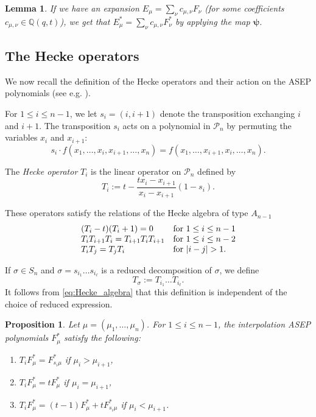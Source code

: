 \documentclass[12pt]{amsart}
\newtheorem{lem}[thm]{Lemma}
\newtheorem{prop}[thm]{Proposition}
\theoremstyle{definition}
\newcommand{\mcP}{\mathcal P}
\newcommand{\QQ}{\mathbb Q}
\begin{document}
\begin{appendices}
\begin{lem}\label{lem:dehomog}
If we have an expansion 
$E_\mu=\sum_{\nu}c_{\mu,\nu}F_\nu$
(for some coefficients $c_{\mu,\nu}\in \QQ(q,t)$), we get that 
$E^*_\mu=\sum_{\nu}c_{\mu,\nu}F^*_\nu$ by applying the map $\boldsymbol{\psi}$.
\end{lem}

\subsection{The Hecke operators}
We now recall the definition of the Hecke operators and their action on the ASEP polynomials (see e.g. \cite[Section 2.3]{BenDaliWilliams2025}).

For $1\leq i \leq n-1$, we let $s_i=(i,i+1)$ denote the transposition exchanging $i$ and $i+1$. The transposition $s_i$ acts on a polynomial in $\mcP_n$ by permuting the variables $x_i$ and $x_{i+1}$:
$$s_i\cdotp f(x_1,\dots,x_i,x_{i+1},\dots,x_n)
=f(x_1,\dots,x_{i+1},x_i,\dots,x_n).$$

The \emph{Hecke operator} $T_i$ is the linear operator on $\mcP_n$ defined by 
\begin{equation}\label{eq:Hecke}
T_i:=t-\frac{tx_i-x_{i+1}}{x_i-x_{i+1}}(1-s_i).
\end{equation}

These operators satisfy the relations of the Hecke algebra of type $A_{n-1}$
\begin{equation}\label{eq:Hecke_algebra}
\begin{array}{ll}
(T_i-t)(T_i+1)=0 & \text{for $1\leq i \leq n-1$}     \\
 T_iT_{i+1}T_i=T_{i+1}T_iT_{i+1}    & \text{for $1\leq i \leq n-2$}\\
 T_iT_j=T_jT_i    & \text{for $ |i-j| > 1$}.\\
\end{array}
\end{equation}


If $\sigma\in S_n$ and $\sigma=s_{i_1}\dots s_{i_\ell}$ is a reduced decomposition of $\sigma$, we define 
\begin{equation}\label{def:Hecke}
T_\sigma:=T_{i_1}\dots T_{i_\ell}.
\end{equation}
It follows from \eqref{eq:Hecke_algebra} that this definition is independent of the choice of reduced expression. 


\begin{prop}\label{prop:T_i-F_star} \cite[Proposition 2.10]{BenDaliWilliams2025}
    Let $\mu = (\mu_1,\dots,\mu_n)$.  For $1\leq i \leq n-1$, the interpolation ASEP polynomials $F^*_\mu$ satisfy the following: 
    \begin{enumerate}
        \item\label{item 1} $T_i F^*_{\mu}=F^*_{s_i\mu}$ if $\mu_i>\mu_{i+1}$,
        \item\label{item 2} $T_iF^*_{\mu}=tF^*_{\mu}$ if $\mu_i=\mu_{i+1}$,
        \item\label{item 3} $T_i F^*_{\mu}=(t-1)F^*_{\mu}+tF^*_{s_i\mu}$ if $\mu_i<\mu_{i+1}$.
    \end{enumerate}
\end{prop}


\end{appendices}
\end{document}
